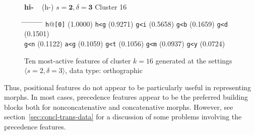 \begin{figure}[ht] 
\begin{mdframed}
{\LARGE \textbf{hi-}} {\large\,\,\, (h-)} \hfill \large{$s=\textbf{2}, \delta=\textbf{3}$} \hfill Cluster 16\\
\vspace{-6pt}
\begin{normalsize}
\begin{tabbing}
\hspace{6ex} \= \hspace{10ex} \= \hspace{6ex} \= \hspace{10ex} \= \hspace{6ex} \= \hspace{10ex} \= \hspace{6ex} \= \hspace{10ex} \= \hspace{6ex} \= \hspace{10ex} \kill
\texttt{h}@\texttt{[0]} \> (1.0000) \> \texttt{h<g} \> (0.9271) \> \texttt{g<i} \> (0.5658) \> \texttt{g<b} \> (0.1659) \> \texttt{g<d} \> (0.1501) \\
\texttt{g<n} \> (0.1122) \> \texttt{a<g} \> (0.1059) \> \texttt{g<t} \> (0.1056) \> \texttt{g<m} \> (0.0937) \> \texttt{g<y} \> (0.0724)
\end{tabbing}
\end{normalsize}
\caption{Ten most-active features of cluster $k = 16$ generated at the settings $\langle s=2,\delta=3 \rangle$, data type: orthographic}
\label{fig:cluster-16-2-3-O}
\end{mdframed}
\end{figure}

Thus, positional features do not appear to be particularly useful in representing morphs. In most cases, precedence features appear to be the preferred building blocks both for nonconcatenative and concatenative morphs. However, see section~\ref{sec:concl-trans-data} for a discussion of some problems involving the precedence features.

